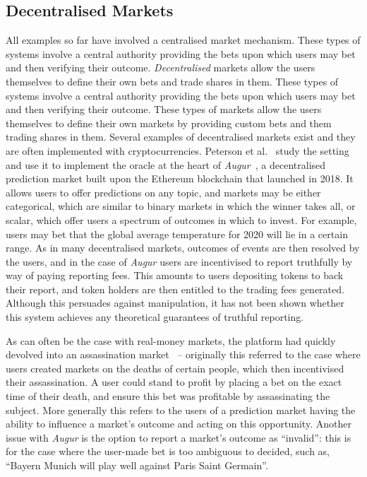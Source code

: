 \subsection{Decentralised Markets}

All examples so far have involved a centralised market mechanism. These types
of systems involve a central authority providing the bets upon which users may
bet and then verifying their outcome. \emph{Decentralised} markets allow the
users themselves to define their own bets and trade shares in them. These types
of systems involve a central authority providing the bets upon which users may
bet and then verifying their outcome. These types of markets allow the users
themselves to define their own markets by providing custom bets and them
trading shares in them. Several examples of decentralised markets exist and
they are often implemented with cryptocurrencies. Peterson et
al.~\cite{Peterson2015} study the setting and use it to implement the oracle at
the heart of \emph{Augur}~\cite{Augur}, a decentralised prediction market built
upon the Ethereum blockchain that launched in 2018. It allows users to offer
predictions on any topic, and markets may be either categorical, which are
similar to binary markets in which the winner takes all, or scalar, which offer
users a spectrum of outcomes in which to invest. For example, users may bet
that the global average temperature for 2020 will lie in a certain range.  As
in many decentralised markets, outcomes of events are then resolved by the
users, and in the case of \emph{Augur} users are incentivised to report
truthfully by way of paying reporting fees. This amounts to users depositing
tokens to back their report, and token holders are then entitled to the trading
fees generated. Although this persuades against manipulation, it has not been
shown whether this system achieves any theoretical guarantees of truthful
reporting.

As can often be the case with real-money markets, the platform had quickly
devolved into an assassination market~\cite{AugurDeathMarket} -- originally
this referred to the case where users created markets on the deaths of certain
people, which then incentivised their assassination. A user could stand to
profit by placing a bet on the exact time of their death, and ensure this bet
was profitable by assassinating the subject. More generally this refers to the
users of a prediction market having the ability to influence a market's outcome
and acting on this opportunity. Another issue with \emph{Augur} is the option
to report a market's outcome as ``invalid'': this is for the case where the
user-made bet is too ambiguous to decided, such as, ``Bayern Munich will play
well against Paris Saint Germain''.


